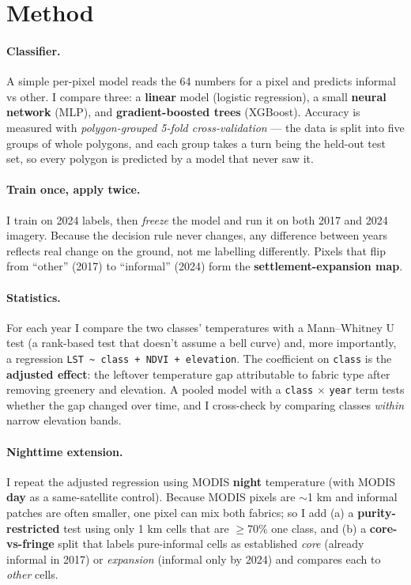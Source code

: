 \documentclass[11pt]{article}
\begin{document}
\section{Method}\label{sec:method}
\paragraph{Classifier.} A simple per-pixel model reads the 64 numbers for a
pixel and predicts informal vs other. I compare three: a \textbf{linear} model
(logistic regression), a small \textbf{neural network} (MLP), and
\textbf{gradient-boosted trees} (XGBoost). Accuracy is measured with
\emph{polygon-grouped 5-fold cross-validation} --- the data is split into five
groups of whole polygons, and each group takes a turn being the held-out test
set, so every polygon is predicted by a model that never saw it.

\paragraph{Train once, apply twice.} I train on 2024 labels, then \emph{freeze}
the model and run it on both 2017 and 2024 imagery. Because the decision rule
never changes, any difference between years reflects real change on the ground,
not me labelling differently. Pixels that flip from ``other'' (2017) to
``informal'' (2024) form the \textbf{settlement-expansion map}.

\paragraph{Statistics.} For each year I compare the two classes' temperatures
with a Mann--Whitney U test (a rank-based test that doesn't assume a bell
curve) and, more importantly, a regression
\texttt{LST \textasciitilde{} class + NDVI + elevation}. The coefficient on
\texttt{class} is the \textbf{adjusted effect}: the leftover temperature gap
attributable to fabric type after removing greenery and elevation. A pooled
model with a \texttt{class} $\times$ \texttt{year} term tests whether the gap
changed over time, and I cross-check by comparing classes \emph{within} narrow
elevation bands.

\paragraph{Nighttime extension.} I repeat the adjusted regression using MODIS
\textbf{night} temperature (with MODIS \textbf{day} as a same-satellite
control). Because MODIS pixels are $\sim$1 km and informal patches are often
smaller, one pixel can mix both fabrics; so I add (a) a \textbf{purity-restricted}
test using only 1 km cells that are $\geq$70\% one class, and (b) a
\textbf{core-vs-fringe} split that labels pure-informal cells as established
\emph{core} (already informal in 2017) or \emph{expansion} (informal only by
2024) and compares each to \emph{other} cells.
\end{document}
